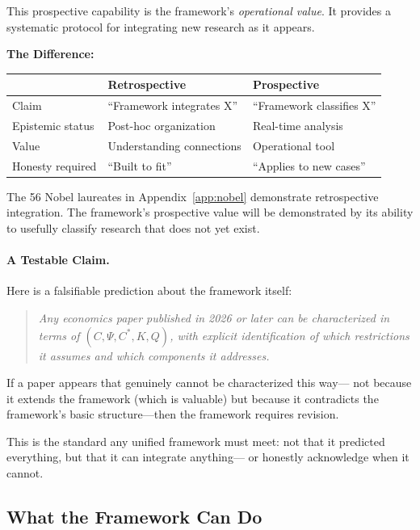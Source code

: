 \documentclass[12pt,a4paper]{article}
\begin{document}
This prospective capability is the framework's \emph{operational value}.
It provides a systematic protocol for integrating new research as it appears.

\textbf{The Difference:}
\begin{center}
\renewcommand{\arraystretch}{1.3}
\begin{tabular}{lll}
\hline
& \textbf{Retrospective} & \textbf{Prospective} \\
\hline
Claim & ``Framework integrates X'' & ``Framework classifies X'' \\
Epistemic status & Post-hoc organization & Real-time analysis \\
Value & Understanding connections & Operational tool \\
Honesty required & ``Built to fit'' & ``Applies to new cases'' \\
\hline
\end{tabular}
\end{center}

The 56 Nobel laureates in Appendix~\ref{app:nobel} demonstrate retrospective
integration. The framework's prospective value will be demonstrated by
its ability to usefully classify research that does not yet exist.

\paragraph{A Testable Claim.}
Here is a falsifiable prediction about the framework itself:

\begin{quote}
\emph{Any economics paper published in 2026 or later can be characterized
in terms of $(C, \Psi, C^*, K, Q)$, with explicit identification of
which restrictions it assumes and which components it addresses.}
\end{quote}

If a paper appears that genuinely cannot be characterized this way---
not because it extends the framework (which is valuable) but because
it contradicts the framework's basic structure---then the framework
requires revision.

This is the standard any unified framework must meet:
not that it predicted everything, but that it can integrate anything---
or honestly acknowledge when it cannot.

\subsection{What the Framework Can Do}
\end{document}
